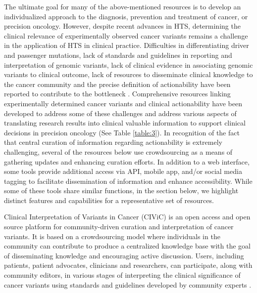 \documentclass{article}
\begin{document}
The ultimate goal for many of the above-mentioned resources is to
develop an individualized approach to the diagnosis, prevention and
treatment of cancer, or precision oncology. However, despite recent
advances in HTS, determining the clinical relevance of experimentally
observed cancer variants remains a challenge in the application of HTS
in clinical practice. Difficulties in differentiating driver and
passenger mutations, lack of standards and guidelines in reporting and
interpretation of genomic variants, lack of clinical evidence in
associating genomic variants to clinical outcome, lack of resources to
disseminate clinical knowledge to the cancer community and the precise
definition of actionability have been reported to contribute to the
bottleneck
\parencite{Li2017-aw,Prawira2017-gv,Uzilov2016-ct,Hedley_Carr2016-ul}. Comprehensive
resources linking experimentally determined cancer variants and
clinical actionability have been developed to address some of these
challenges and address various aspects of translating research results
into clinical valuable information to support clinical decisions in
precision oncology (See Table \ref{table:3}). In recognition of the fact that
central curation of information regarding actionability is extremely
challenging, several of the resources below use crowdsourcing as a
means of gathering updates and enhancing curation efforts. In addition
to a web interface, some tools provide additional access via API,
mobile app, and/or social media tagging to facilitate dissemination of
information and enhance accessibility. While some of these tools share
similar functions, in the section below, we highlight distinct
features and capabilities for a representative set of resources.

Clinical Interpretation of Variants in Cancer (CIViC) is an open
access and open source platform for community-driven curation and
interpretation of cancer variants. It is based on a crowdsourcing
model where individuals in the community can contribute to produce a
centralized knowledge base with the goal of disseminating knowledge
and encouraging active discussion. Users, including patients, patient
advocates, clinicians and researchers, can participate, along with
community editors, in various stages of interpreting the clinical
significance of cancer variants using standards and guidelines
developed by community experts \parencite{Li2017-aw,Griffith2016-sy}.
\end{document}
